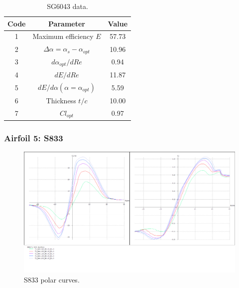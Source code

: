 \documentclass[../TFG_Annex.tex]{subfiles}
\begin{document}
\begin{table}[h!]
	\centering
	\begin{tabular}{c|c|c}
Code & Parameter                                    & Value  \\ \hline
1    & Maximum efficiency $E$                      &       57.73             \\
2    & $\Delta \alpha=\alpha_{s}-\alpha_{opt}$    &           10.96          \\
3    & ${d\alpha_{opt}}/{dRe}$                     &               0.94     \\
4    & ${dE}/{dRe}$                                &        11.87            \\
5    & ${dE}/{d \alpha} (\alpha=\alpha_{opt})$      &           5.59        \\
6    & Thickness $t/c$                            &              10.00      \\
7    & $Cl_{opt}$  &   0.97
\end{tabular}
	\caption{SG6043 data.}
	\label{tab:Airf4}
\end{table}

\newpage
\subsubsection{Airfoil 5: S833}


\begin{figure}[h!]
	\centering
	\includegraphics[width=1\linewidth]{"../../04-Airfoil selection/Imatges airfoils/5-S833"}
	\caption{S833 polar curves.}
	\label{fig:5-s833}
\end{figure}
\end{document}
